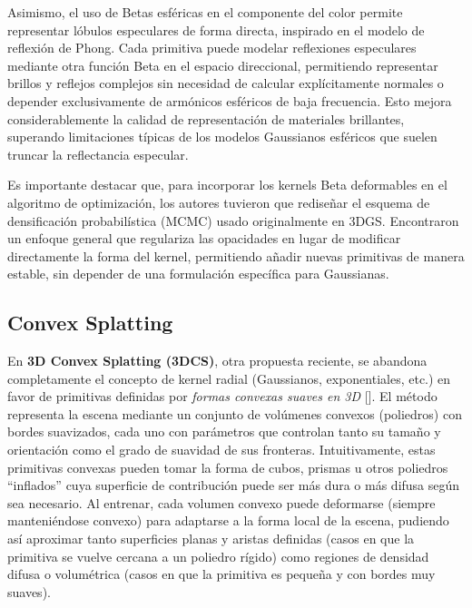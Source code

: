 Asimismo, el uso de Betas esféricas en el componente del color permite representar lóbulos especulares de forma directa, inspirado en el modelo de reflexión de Phong. Cada primitiva puede modelar reflexiones especulares mediante otra función Beta en el espacio direccional, permitiendo representar brillos y reflejos complejos sin necesidad de calcular explícitamente normales o depender exclusivamente de armónicos esféricos de baja frecuencia. Esto mejora considerablemente la calidad de representación de materiales brillantes, superando limitaciones típicas de los modelos Gaussianos esféricos que suelen truncar la reflectancia especular.

Es importante destacar que, para incorporar los kernels Beta deformables en el algoritmo de optimización, los autores tuvieron que rediseñar el esquema de densificación probabilística (MCMC) usado originalmente en 3DGS. Encontraron un enfoque general que regulariza las opacidades en lugar de modificar directamente la forma del kernel, permitiendo añadir nuevas primitivas de manera estable, sin depender de una formulación específica para Gaussianas.


\subsection{Convex Splatting}

En \textbf{3D Convex Splatting (3DCS)}, otra propuesta reciente, se abandona completamente el concepto de kernel radial (Gaussianos, exponentiales, etc.) en favor de primitivas definidas por \textit{formas convexas suaves en 3D} [\cite{held20243dconvexsplattingradiance}]. El método representa la escena mediante un conjunto de volúmenes convexos (poliedros) con bordes suavizados, cada uno con parámetros que controlan tanto su tamaño y orientación como el grado de suavidad de sus fronteras. Intuitivamente, estas primitivas convexas pueden tomar la forma de cubos, prismas u otros poliedros “inflados” cuya superficie de contribución puede ser más dura o más difusa según sea necesario. Al entrenar, cada volumen convexo puede deformarse (siempre manteniéndose convexo) para adaptarse a la forma local de la escena, pudiendo así aproximar tanto superficies planas y aristas definidas (casos en que la primitiva se vuelve cercana a un poliedro rígido) como regiones de densidad difusa o volumétrica (casos en que la primitiva es pequeña y con bordes muy suaves).

